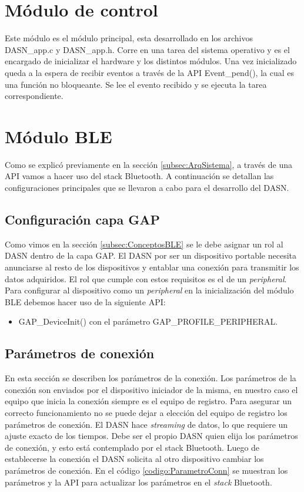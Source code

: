 
\newpage
\section{Módulo de control}
Este módulo es el módulo principal, esta desarrollado en los archivos DASN\_app.c y DASN\_app.h. Corre en una tarea del sistema operativo y es el encargado de inicializar el hardware y los distintos módulos. Una vez inicializado queda a la espera de recibir eventos a través de la API Event\_pend(), la cual es una función no bloqueante. Se lee el evento recibido y se ejecuta la tarea correspondiente. 

\section{Módulo BLE}
Como se explicó previamente en la sección \ref{subsec:ArqSistema}, a través de una API vamos a hacer uso del stack Bluetooth. A continuación se detallan las configuraciones principales que se llevaron a cabo para el desarrollo del DASN. 

\subsection{Configuración capa GAP}
Como vimos en la sección \ref{subsec:ConceptosBLE} se le debe asignar un rol al DASN dentro de la capa GAP. El DASN por ser un dispositivo portable necesita anunciarse al resto de los dispositivos y entablar una conexión para transmitir los datos adquiridos. El rol que cumple con estos requisitos es el de un \textit{peripheral}. Para configurar al dispositivo como un \textit{peripheral} en la inicialización del módulo BLE debemos hacer uso de la siguiente API:
\begin{itemize}
\item GAP\_DeviceInit() con el parámetro GAP\_PROFILE\_PERIPHERAL.
\end{itemize}

\subsection{Parámetros de conexión}
En esta sección se describen los parámetros de la conexión. Los parámetros de la conexión son enviados por el dispositivo iniciador de la misma, en nuestro caso el equipo que inicia la conexión siempre es el equipo de registro. Para asegurar un correcto funcionamiento no se puede dejar a elección del equipo de registro los parámetros de conexión. El DASN hace \textit{streaming} de datos, lo que requiere un ajuste exacto de los tiempos. Debe ser el propio DASN quien elija los parámetros de conexión, y esto está contemplado por el stack Bluetooth. Luego de establecerse la conexión el DASN solicita al otro dispositivo cambiar los parámetros de conexión. En el código \ref{codigo:ParametroConn} se muestran los parámetros y la API para actualizar los parámetros en el \textit{stack} Bluetooth.



